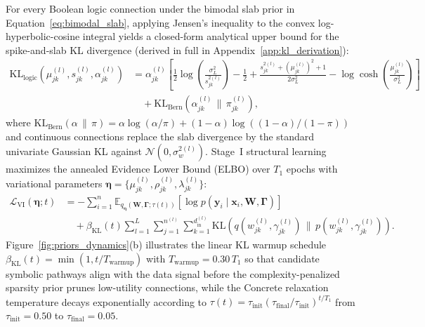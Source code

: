 \documentclass[11pt,a4paper]{article}
\begin{document}
For every Boolean logic connection under the bimodal slab prior in Equation~\eqref{eq:bimodal_slab}, applying Jensen's inequality to the convex log-hyperbolic-cosine integral yields a closed-form analytical upper bound for the spike-and-slab KL divergence (derived in full in Appendix~\ref{app:kl_derivation}):
\begin{equation}
\label{eq:kl_bimodal}
\begin{aligned}
\mathrm{KL}_{\text{logic}}\!\left(\mu_{jk}^{(l)}, s_{jk}^{(l)}, \alpha_{jk}^{(l)}\right) &= \alpha_{jk}^{(l)}\!\left[\frac{1}{2}\log\!\left(\frac{\sigma_L^2}{s_{jk}^{2(l)}}\right) - \frac{1}{2} + \frac{s_{jk}^{2(l)} + (\mu_{jk}^{(l)})^2 + 1}{2\sigma_L^2} - \log\cosh\!\left(\frac{\mu_{jk}^{(l)}}{\sigma_L^2}\right)\right] \\
&\quad + \mathrm{KL}_{\text{Bern}}\!\left(\alpha_{jk}^{(l)} \,\|\, \pi_{jk}^{(l)}\right),
\end{aligned}
\end{equation}
where $\mathrm{KL}_{\text{Bern}}(\alpha \,\|\, \pi) = \alpha \log(\alpha / \pi) + (1 - \alpha)\log((1 - \alpha)/(1 - \pi))$ and continuous connections replace the slab divergence by the standard univariate Gaussian KL against $\mathcal{N}(0, \sigma_w^{2(l)})$. Stage~I structural learning maximizes the annealed Evidence Lower Bound (ELBO) over $T_1$ epochs with variational parameters $\bm{\eta} = \{\mu_{jk}^{(l)}, \rho_{jk}^{(l)}, \lambda_{jk}^{(l)}\}$:
\begin{equation}
\label{eq:annealed_elbo}
\begin{aligned}
\mathcal{L}_{\text{VI}}(\bm{\eta}; t) &= -\sum_{i=1}^n \mathbb{E}_{q_{\bm{\eta}}(\bm{W}, \bm{\Gamma}; \tau(t))}\!\left[\log p(\bm{y}_i \mid \bm{x}_i, \bm{W}, \bm{\Gamma})\right] \\
&\quad + \beta_{\text{KL}}(t) \sum_{l=1}^L \sum_{j=1}^{n^{(l)}} \sum_{k=1}^{d_{\text{in}}^{(l)}} \mathrm{KL}\!\left(q(w_{jk}^{(l)}, \gamma_{jk}^{(l)}) \,\|\, p(w_{jk}^{(l)}, \gamma_{jk}^{(l)})\right).
\end{aligned}
\end{equation}
Figure~\ref{fig:priors_dynamics}(b) illustrates the linear KL warmup schedule $\beta_{\text{KL}}(t) = \min(1, t / T_{\text{warmup}})$ with $T_{\text{warmup}} = 0.30\,T_1$ so that candidate symbolic pathways align with the data signal before the complexity-penalized sparsity prior prunes low-utility connections, while the Concrete relaxation temperature decays exponentially according to $\tau(t) = \tau_{\text{init}}(\tau_{\text{final}} / \tau_{\text{init}})^{t / T_1}$ from $\tau_{\text{init}} = 0.50$ to $\tau_{\text{final}} = 0.05$.
\end{document}
